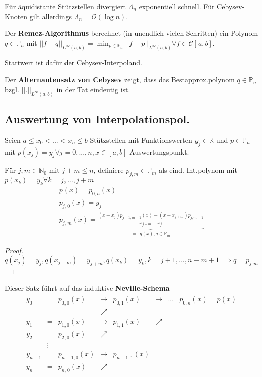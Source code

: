 \begin{remark}
	Für äquidistante Stützstellen divergiert $\Lambda_n$ exponentiell schnell. Für Cebysev-Knoten gilt allerdings $\Lambda_n = \mathcal{O}(\log n)$.
\end{remark}

\begin{remark}
	Der \textbf{Remez-Algorithmus} berechnet (in unendlich vielen Schritten) ein Polynom $q \in \mathbb{P}_n$ mit $||f-q||_{L^\infty(a,b)} = \min_{p \in \mathbb{P}_n} ||f-p||_{L^\infty(a,b)} \forall f\in\mathcal{C}[a,b]$.
	
	Startwert ist dafür der Cebysev-Interpoland.
	
	Der \textbf{Alternantensatz von Cebysev} zeigt, dass das Bestapprox.polynom $q \in \mathbb{P}_n$ bzgl. $||.||_{L^\infty(a,b)}$ in der Tat eindeutig ist.
\end{remark}

\subsection{Auswertung von Interpolationspol.}

\begin{theorem}
	Seien $a \leq x_0 < ... < x_n \leq b$ Stützstellen mit Funktionswerten $y_j \in \mathbb{K}$ und $p \in \mathbb{P}_n$ mit $p(x_j) = y_j \forall j=0, ..., n, x \in [a, b]$ Auswertungspunkt.
	
	Für $j,m \in \mathbb{N}_0$ mit $j + m \leq n$, definiere $p_{j,m} \in \mathbb{P}_m$ als eind. Int.polynom mit $p(x_k) = y_k \forall k=j, ..., j+m$
	\begin{align*}
		p(x) = p_{0, n}(x)\\
		p_{j,0}(x) = y_j\\
		p_{j,m}(x) = \underbrace{\frac{(x-x_j) p_{j+1, m-1}(x) - (x-x_{j+m}) p_{j,m-1}}{x_{j+m}-x_j}}_{=:q(x), q \in \mathbb{P}_m}
	\end{align*}
\end{theorem}

\begin{proof}
	$q(x_j) = y_j, q(x_{j+m}) = y_{j+m}, q(x_k) = y_k, k=j+1, ..., n-m+1 \implies q=p_{j,m}$
\end{proof}

Dieser Satz führt auf das induktive \textbf{Neville-Schema}
\begin{align*}
	\begin{matrix}
		y_0 &= & p_{0,0}(x) & \rightarrow & p_{0,1}(x) & \rightarrow & ... & p_{0,n}(x) = p(x)\\
		                 &  & & \nearrow    &            & & & \\
		y_1 &= & p_{1,0}(x) & \rightarrow & p_{1,1}(x) & \nearrow    & & \\
		y_2 &= & p_{2,0}(x) & \nearrow & & & \\
		&\vdots & & & & & \\
		y_{n-1} &= & p_{n-1,0}(x) & \rightarrow & p_{n-1,1}(x) & & \\
		y_n &= & p_{n,0}(x) & \nearrow & & & \\
	\end{matrix}
\end{align*}

